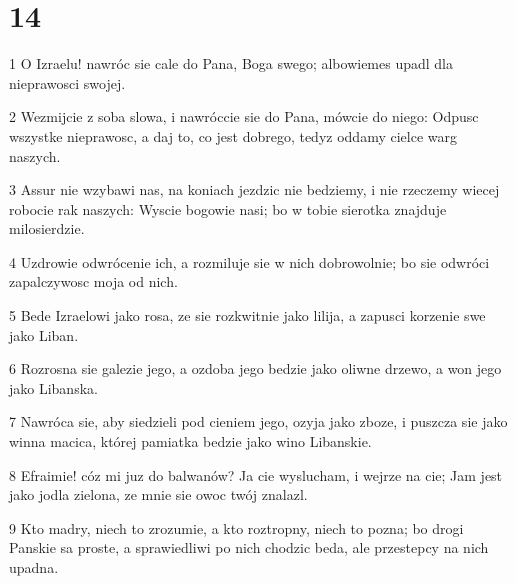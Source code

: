 \chapter{14}

\par 1 O Izraelu! nawróc sie cale do Pana, Boga swego; albowiemes upadl dla nieprawosci swojej.
\par 2 Wezmijcie z soba slowa, i nawróccie sie do Pana, mówcie do niego: Odpusc wszystke nieprawosc, a daj to, co jest dobrego, tedyz oddamy cielce warg naszych.
\par 3 Assur nie wzybawi nas, na koniach jezdzic nie bedziemy, i nie rzeczemy wiecej robocie rak naszych: Wyscie bogowie nasi; bo w tobie sierotka znajduje milosierdzie.
\par 4 Uzdrowie odwrócenie ich, a rozmiluje sie w nich dobrowolnie; bo sie odwróci zapalczywosc moja od nich.
\par 5 Bede Izraelowi jako rosa, ze sie rozkwitnie jako lilija, a zapusci korzenie swe jako Liban.
\par 6 Rozrosna sie galezie jego, a ozdoba jego bedzie jako oliwne drzewo, a won jego jako Libanska.
\par 7 Nawróca sie, aby siedzieli pod cieniem jego, ozyja jako zboze, i puszcza sie jako winna macica, której pamiatka bedzie jako wino Libanskie.
\par 8 Efraimie! cóz mi juz do balwanów? Ja cie wyslucham, i wejrze na cie; Jam jest jako jodla zielona, ze mnie sie owoc twój znalazl.
\par 9 Kto madry, niech to zrozumie, a kto roztropny, niech to pozna; bo drogi Panskie sa proste, a sprawiedliwi po nich chodzic beda, ale przestepcy na nich upadna.


